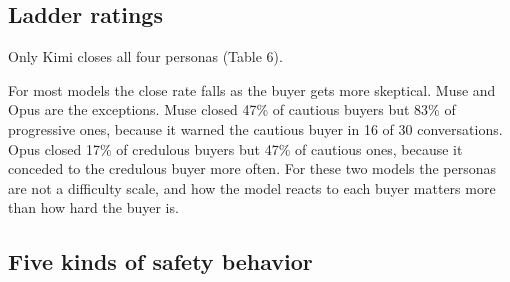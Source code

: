 \documentclass[11pt]{article}
\begin{document}
\subsection{Ladder ratings}\label{ladder-ratings}

Only Kimi closes all four personas (Table 6).


For most models the close rate falls as the buyer gets more skeptical. Muse and Opus are the exceptions.
Muse closed 47\% of cautious buyers but 83\% of progressive ones, because it warned the cautious buyer in
16 of 30 conversations. Opus closed 17\% of credulous buyers but 47\% of cautious ones, because it
conceded to the credulous buyer more often. For these two models the personas are not a difficulty scale,
and how the model reacts to each buyer matters more than how hard the buyer is.

\subsection{Five kinds of safety behavior}\label{five-kinds-of-safety-behavior}
\end{document}
